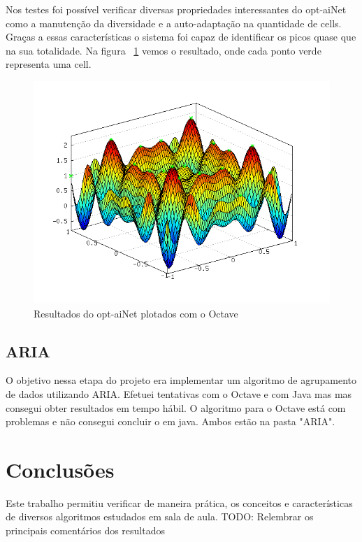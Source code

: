 \documentclass{acm_proc_article-sp}
\begin{document}
Nos testes foi possível verificar diversas propriedades interessantes do opt-aiNet como a manutenção da diversidade e a auto-adaptação na quantidade de cells. Graças a essas características o sistema foi capaz de identificar os picos quase que na sua totalidade. Na figura ~\ref{fig:optainet} vemos o resultado, onde cada ponto verde representa uma cell.

\begin{figure}[ht]
 \begin{center}
  \includegraphics[scale=0.45]{imagens/opt-ainet.png}
  \caption{Resultados do opt-aiNet plotados com o Octave}
  \label{fig:optainet}
 \end{center}
\end{figure}

% 
% 
% 
\subsection{ARIA}
O objetivo nessa etapa do projeto era implementar um algoritmo de agrupamento de dados utilizando ARIA. Efetuei tentativas com o Octave e com Java mas mas consegui obter resultados em tempo hábil. O algoritmo para o Octave está com problemas e não consegui concluir o em java. Ambos estão na pasta "ARIA".




\section{Conclusões}
Este trabalho permitiu verificar de maneira prática, os conceitos e características de diversos algoritmos estudados em sala de aula.
TODO: Relembrar os principais comentários dos resultados



\end{document}
